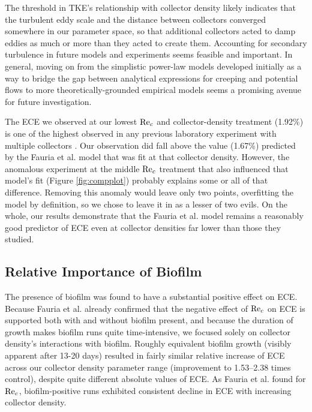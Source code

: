 \documentclass[geosciences,article,submit,moreauthors,pdftex]{Definitions/mdpi}
\begin{document}
The threshold in TKE's relationship with collector density likely indicates that the turbulent eddy scale and the distance between collectors converged somewhere in our parameter space, so that additional collectors acted to damp eddies as much or more than they acted to create them. Accounting for secondary turbulence in future models and experiments seems feasible and important. In general, moving on from the simplistic power-law models developed initially as a way to bridge the gap between analytical expressions for creeping and potential flows to more theoretically-grounded empirical models \cite{stein2020} seems a promising avenue for future investigation.

The ECE we observed at our lowest $\mathrm{Re}_c$ and collector-density treatment (1.92\%) is one of the highest observed in any previous laboratory experiment with multiple collectors \cite{stein2020}. Our observation did fall above the value (1.67\%) predicted by the Fauria et al. model \cite{Fauria_2015} that was fit at that collector density. However, the anomalous experiment at the middle $\mathrm{Re}_c$ treatment that also influenced that model's fit (Figure \ref{fig:compplot}) probably explains some or all of that difference. Removing this anomaly would leave only two points, overfitting the model by definition, so we chose to leave it in as a lesser of two evils. On the whole, our results demonstrate that the Fauria et al. model remains a reasonably good predictor of ECE even at collector densities far lower than those they studied.

\subsection{Relative Importance of Biofilm}

The presence of biofilm was found to have a substantial positive effect on ECE. Because Fauria et al. \cite{Fauria_2015} already confirmed that the negative effect of $\mathrm{Re}_c$ on ECE is supported both with and without biofilm present, and because the duration of growth makes biofilm runs quite time-intensive, we focused solely on collector density's interactions with biofilm. Roughly equivalent biofilm growth (visibly apparent after 13-20 days) resulted in fairly similar relative increase of ECE across our collector density parameter range (improvement to 1.53--2.38 times control), despite quite different absolute values of ECE. As Fauria et al. \cite{Fauria_2015} found for $\mathrm{Re}_c$, biofilm-positive runs exhibited consistent decline in ECE with increasing collector density.
\end{document}
